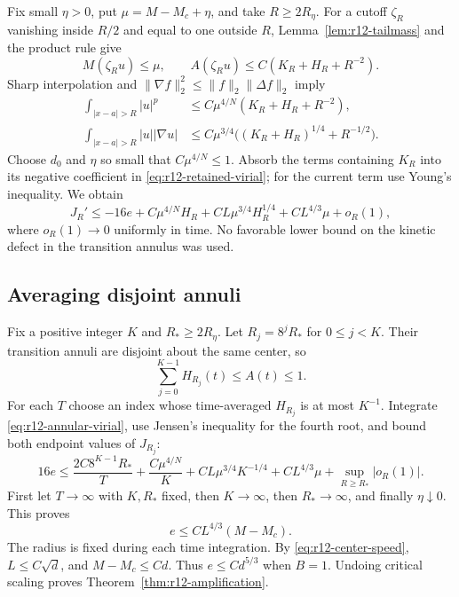 Fix small $\eta>0$, put $\mu=M-M_c+\eta$, and take $R\ge2R_\eta$.
For a cutoff $\zeta_R$ vanishing inside $R/2$ and equal to one outside
$R$, Lemma~\ref{lem:r12-tailmass} and the product rule give
\[
 M(\zeta_Ru)\le\mu,\qquad
 A(\zeta_Ru)\le C(K_R+H_R+R^{-2}).
\]
Sharp interpolation and
$\|\nabla f\|_2^2\le\|f\|_2\|\Delta f\|_2$ imply
\begin{align*}
 \int_{|x-a|>R}|u|^p
   &\le C\mu^{4/N}(K_R+H_R+R^{-2}),\\
 \int_{|x-a|>R}|u||\nabla u|
   &\le C\mu^{3/4}\bigl((K_R+H_R)^{1/4}+R^{-1/2}\bigr).
\end{align*}
Choose $d_0$ and $\eta$ so small that $C\mu^{4/N}\le1$.
Absorb the terms containing $K_R$ into its negative coefficient in
\eqref{eq:r12-retained-virial}; for the current term use Young's inequality.
We obtain
\begin{equation}\label{eq:r12-annular-virial}
 J_R'\le-16e+C\mu^{4/N}H_R+CL\mu^{3/4}H_R^{1/4}
             +CL^{4/3}\mu+o_R(1),
\end{equation}
where $o_R(1)\to0$ uniformly in time. No favorable lower bound on the
kinetic defect in the transition annulus was used.

\subsection{Averaging disjoint annuli}
Fix a positive integer $K$ and $R_*\ge2R_\eta$. Let
$R_j=8^jR_*$ for $0\le j<K$. Their transition annuli are disjoint about
the same center, so
\[
 \sum_{j=0}^{K-1}H_{R_j}(t)\le A(t)\le1.
\]
For each $T$ choose an index whose time-averaged $H_{R_j}$ is at most
$K^{-1}$. Integrate \eqref{eq:r12-annular-virial}, use Jensen's inequality
for the fourth root, and bound both endpoint values of $J_{R_j}$:
\[
 16e\le\frac{2C8^{K-1}R_*}{T}
       +\frac{C\mu^{4/N}}K+CL\mu^{3/4}K^{-1/4}
       +CL^{4/3}\mu+\sup_{R\ge R_*}|o_R(1)|.
\]
First let $T\to\infty$ with $K,R_*$ fixed, then $K\to\infty$,
then $R_*\to\infty$, and finally $\eta\downarrow0$. This proves
\[
 e\le CL^{4/3}(M-M_c).
\]
The radius is fixed during each time integration. By
\eqref{eq:r12-center-speed}, $L\le C\sqrt d$, and $M-M_c\le Cd$.
Thus $e\le Cd^{5/3}$ when $B=1$. Undoing critical scaling proves
Theorem~\ref{thm:r12-amplification}.

